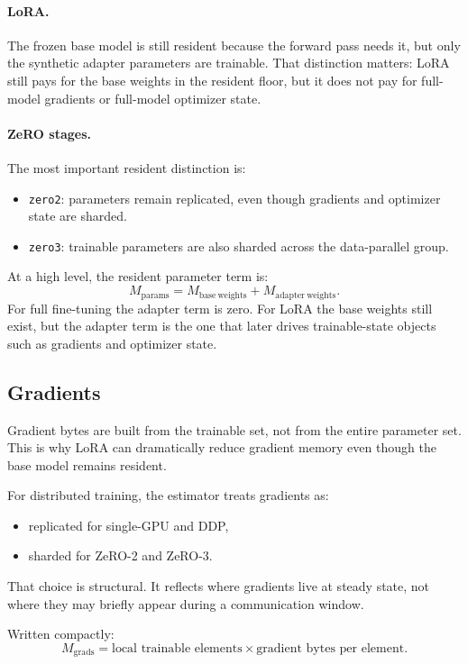 \paragraph{LoRA.}
The frozen base model is still resident because the forward pass needs it, but
only the synthetic adapter parameters are trainable. That distinction matters:
LoRA still pays for the base weights in the resident floor, but it does not pay
for full-model gradients or full-model optimizer state.

\paragraph{ZeRO stages.}
The most important resident distinction is:
\begin{itemize}[leftmargin=1.5em]
\item \texttt{zero2}: parameters remain replicated, even though gradients and
optimizer state are sharded.
\item \texttt{zero3}: trainable parameters are also sharded across the
data-parallel group.
\end{itemize}

At a high level, the resident parameter term is:
\[
M_{\mathrm{params}} =
M_{\mathrm{base\ weights}}
+ M_{\mathrm{adapter\ weights}}.
\]
For full fine-tuning the adapter term is zero. For LoRA the base weights still
exist, but the adapter term is the one that later drives trainable-state
objects such as gradients and optimizer state.

\subsection{Gradients}
Gradient bytes are built from the trainable set, not from the entire parameter
set. This is why LoRA can dramatically reduce gradient memory even though the
base model remains resident.

For distributed training, the estimator treats gradients as:
\begin{itemize}[leftmargin=1.5em]
\item replicated for single-GPU and DDP,
\item sharded for ZeRO-2 and ZeRO-3.
\end{itemize}

That choice is structural. It reflects where gradients live at steady state,
not where they may briefly appear during a communication window.

Written compactly:
\[
M_{\mathrm{grads}} =
\text{local trainable elements} \times \text{gradient bytes per element}.
\]


